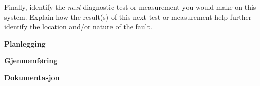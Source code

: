 \begin{enumerate}
Finally, identify the {\it next} diagnostic test or measurement you would make on this system.  Explain how the result(s) of this next test or measurement help further identify the location and/or nature of the fault.

\end{enumerate}


\vskip 5pt 
\textbf{Planlegging}
\vskip 5pt 

\textbf{Gjennomføring}
\vskip 5pt 

\textbf{Dokumentasjon}
\vskip 5pt 

















\vfil \eject


















